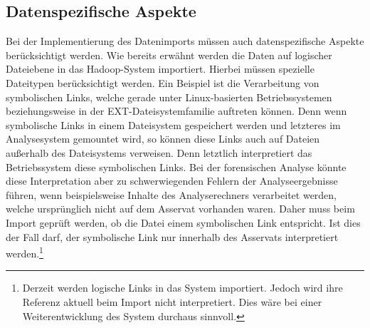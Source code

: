 
\subsection{Datenspezifische Aspekte}
Bei der Implementierung des Datenimports müssen auch datenspezifische Aspekte berücksichtigt werden. Wie bereits erwähnt werden die Daten auf logischer Dateiebene in das Hadoop-System importiert. Hierbei müssen spezielle Dateitypen berücksichtigt werden. Ein Beispiel ist die Verarbeitung von symbolischen Links, welche gerade unter Linux-basierten Betriebssystemen beziehungsweise in der EXT-Dateisystemfamilie auftreten können. Denn wenn symbolische Links in einem Dateisystem gespeichert werden und letzteres im Analysesystem gemountet wird, so können diese Links auch auf Dateien außerhalb des Dateisystems verweisen. Denn letztlich interpretiert das Betriebssystem diese symbolischen Links. Bei der forensischen Analyse könnte diese  Interpretation aber zu schwerwiegenden Fehlern der Analyseergebnisse führen, wenn beispielsweise Inhalte des Analyserechners verarbeitet werden, welche ursprünglich nicht auf dem Asservat vorhanden waren. Daher muss beim Import geprüft werden, ob die Datei einem symbolischen Link entspricht. Ist dies der Fall darf, der symbolische Link nur innerhalb des Asservats interpretiert werden.\footnote{Derzeit werden logische Links in das System importiert. Jedoch wird ihre Referenz aktuell beim Import nicht interpretiert. Dies wäre bei einer Weiterentwicklung des System durchaus sinnvoll.} \\

